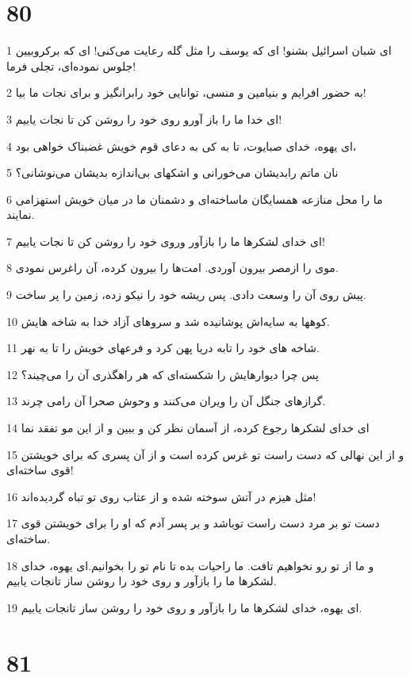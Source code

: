 \chapter{80}

\par 1 ای شبان اسرائیل بشنو! ای که یوسف را مثل گله رعایت می‌کنی! ای که برکروبیین جلوس نموده‌ای، تجلی فرما!
\par 2 به حضور افرایم و بنیامین و منسی، توانایی خود رابرانگیز و برای نجات ما بیا!
\par 3 ‌ای خدا ما را باز آورو روی خود را روشن کن تا نجات یابیم!
\par 4 ‌ای یهوه، خدای صبایوت، تا به کی به دعای قوم خویش غضبناک خواهی بود،
\par 5 نان ماتم رابدیشان می‌خورانی و اشکهای بی‌اندازه بدیشان می‌نوشانی؟
\par 6 ما را محل منازعه همسایگان ماساخته‌ای و دشمنان ما در میان خویش استهزامی نمایند.
\par 7 ‌ای خدای لشکرها ما را بازآور وروی خود را روشن کن تا نجات یابیم!
\par 8 موی را ازمصر بیرون آوردی. امت‌ها را بیرون کرده، آن راغرس نمودی.
\par 9 پیش روی آن را وسعت دادی. پس ریشه خود را نیکو زده، زمین را پر ساخت.
\par 10 کوهها به سایه‌اش پوشانیده شد و سروهای آزاد خدا به شاخه هایش.
\par 11 شاخه های خود را تابه دریا پهن کرد و فرعهای خویش را تا به نهر.
\par 12 پس چرا دیوارهایش را شکسته‌ای که هر راهگذری آن را می‌چیند؟
\par 13 گرازهای جنگل آن را ویران می‌کنند و وحوش صحرا آن رامی چرند.
\par 14 ‌ای خدای لشکرها رجوع کرده، از آسمان نظر کن و ببین و از این مو تفقد نما
\par 15 و از این نهالی که دست راست تو غرس کرده است و از آن پسری که برای خویشتن قوی ساخته‌ای!
\par 16 مثل هیزم در آتش سوخته شده و از عتاب روی تو تباه گردیده‌اند!
\par 17 دست تو بر مرد دست راست توباشد و بر پسر آدم که او را برای خویشتن قوی ساخته‌ای.
\par 18 و ما از تو رو نخواهیم تافت. ما راحیات بده تا نام تو را بخوانیم.‌ای یهوه، خدای لشکرها ما را بازآور و روی خود را روشن ساز تانجات یابیم.
\par 19 ‌ای یهوه، خدای لشکرها ما را بازآور و روی خود را روشن ساز تانجات یابیم.
 
\chapter{81}


